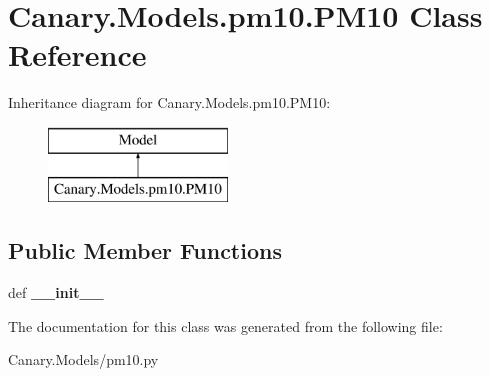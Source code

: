 \hypertarget{class_canary_8_models_1_1pm10_1_1_p_m10}{\section{Canary.\-Models.\-pm10.\-P\-M10 Class Reference}
\label{class_canary_8_models_1_1pm10_1_1_p_m10}
}
Inheritance diagram for Canary.\-Models.\-pm10.\-P\-M10\-:\begin{figure}[H]
\begin{center}
\leavevmode
\includegraphics[height=2.000000cm]{class_canary_8_models_1_1pm10_1_1_p_m10}
\end{center}
\end{figure}
\subsection*{Public Member Functions}
\begin{DoxyCompactItemize}
\item 
\hypertarget{class_canary_8_models_1_1pm10_1_1_p_m10_abbcb7ab99e98619a37a0da59e8420bc8}{def {\bfseries \-\_\-\-\_\-init\-\_\-\-\_\-}}\label{class_canary_8_models_1_1pm10_1_1_p_m10_abbcb7ab99e98619a37a0da59e8420bc8}

\end{DoxyCompactItemize}


The documentation for this class was generated from the following file\-:\begin{DoxyCompactItemize}
\item 
Canary.\-Models/pm10.\-py\end{DoxyCompactItemize}
